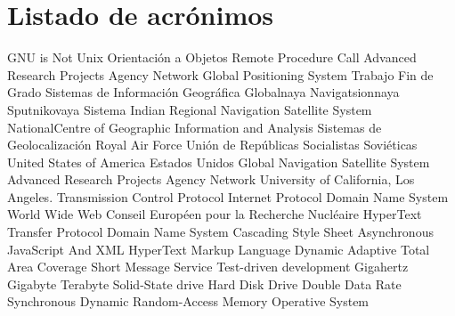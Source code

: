 \chapter{Listado de acrónimos}

{\small
\begin{acronym}[XXXXXXXX]
  		{\acs{GNU} is Not Unix}
  			{Orientación a Objetos}
  		{Remote Procedure Call}
  	{Advanced Research Projects Agency Network}
  		{Global Positioning System}
  		{Trabajo Fin de Grado}
  		{Sistemas de Información Geográfica}
  	{Globalnaya Navigatsionnaya Sputnikovaya Sistema}
  		{Indian Regional Navigation Satellite System}
  		{NationalCentre of Geographic Information and Analysis}
  			{Sistemas de Geolocalización}
  		{Royal Air Force}
  		{Unión de Repúblicas Socialistas Soviéticas}
  		{United States of America}
  		{Estados Unidos}
  		{Global Navigation Satellite System}
  	{Advanced Research Projects Agency Network}
  		{University of California, Los Angeles}.
  		{Transmission Control Protocol}
  			{Internet Protocol}
  		{Domain Name System}
  		{World Wide Web}
  		{Conseil Européen pour la Recherche Nucléaire}
  		{HyperText Transfer Protocol}
  		{Domain Name System}
  		{Cascading Style Sheet}
  		{Asynchronous JavaScript And XML}
  		{HyperText Markup Language}
  	{Dynamic Adaptive Total Area Coverage}
  		{Short Message Service}
  		{Test-driven development}
  		{Gigahertz}
  			{Gigabyte}
  			{Terabyte}
  		{Solid-State drive}
  		{Hard Disk Drive}
  		{Double Data Rate}
  		{Synchronous Dynamic Random-Access Memory}
  			{Operative System}
  
\end{acronym}
}




